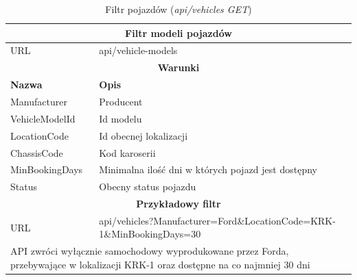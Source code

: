 \documentclass[eng,printmode,openany]{mgr}
\begin{document}
\begin{table}[H]
	\caption{Filtr pojazdów (\textit{api/vehicles GET})}
	\begin{tabularx}{\textwidth}{|l|X|}
		\hline                                       							
		\multicolumn{2}{|c|}{\textbf{Filtr modeli pojazdów}}  							        	\\ \hline
		URL                 & api/vehicle-models     							             		\\ \hline
		\multicolumn{2}{|c|}{\textbf{Warunki}}     													\\ \hline
		\textbf{Nazwa}      & \textbf{Opis}              											\\ \hline
		Manufacturer        & Producent         													\\ \hline
		VehicleModelId      & Id modelu	        													\\ \hline
		LocationCode        & Id obecnej lokalizacji												\\ \hline
		ChassisCode         & Kod karoserii 	  													\\ \hline
		MinBookingDays      & Minimalna ilość dni w których pojazd jest dostępny					\\ \hline
		Status              & Obecny status pojazdu         										\\ \hline										
		\multicolumn{2}{|c|}{\textbf{Przykładowy filtr}}											\\ \hline
		URL                 & api/vehicles?Manufacturer=Ford\&LocationCode=KRK-1\&MinBookingDays=30	\\ \hline
		\multicolumn{2}{|X|}{API zwróci wyłącznie samochodowy wyprodukowane przez Forda, przebywające w lokalizacji KRK-1 oraz dostępne na co najmniej 30 dni}		\\ \hline
	\end{tabularx}
\end{table}
\end{document}
